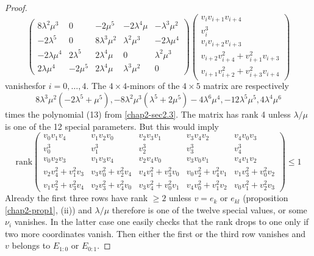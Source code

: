 \begin{proof}
$$\begin{pmatrix}
8\lambda^{2}\mu^{3} & 0 & -2\mu^{5} & -2\lambda^{4}\mu &
-\lambda^{3}\mu^{2}\\[5pt]
-2\lambda^{5} & 0 & 8\lambda^{3}\mu^{2} & \lambda^{2}\mu^{3} &
-2\lambda \mu^{4}\\[5pt]
-2\lambda \mu^{4} & 2\lambda^{5} & 2\lambda^{4}\mu & 0
& \lambda^{2}\mu^{3}\\[5pt]
2\lambda\mu^{4} & -2\mu^{5} & 2\lambda^{4}\mu & \lambda^{3}\mu^{2} & 0
\end{pmatrix}
\begin{pmatrix}
v_{i}v_{i+1}v_{i+4}\\[5pt]
v^{3}_{i}\\[5pt]
v_{i}v_{i+2}v_{i+3}\\[5pt]
v_{i+2}v^{2}_{i+4}+v^{2}_{i+1}v_{i+3}\\[5pt]
v_{i+1}v^{2}_{i+2}+v^{2}_{i+3}v_{i+4}
\end{pmatrix}
$$
vanishes\pageoriginale for $i=0,\ldots,4$. The $4\times 4$-minors of
the $4\times 5$ matrix are respectively
$$
8\lambda^{3}\mu^{2}(-2\lambda^{5}+\mu^{5}),-8\lambda^{2}\mu^{3}(\lambda^{5}+2\mu^{5})-4\lambda^{6}\mu^{4},-12\lambda^{5}\mu^{5},4\lambda^{4}\mu^{6}
$$
times the polynomial (13) from \ref{chap2-sec2.3}. The matrix has rank
4 unless $\lambda/\mu$ is one of the 12 special parameters. But this
would imply
{\fontsize{10pt}{12pt}\selectfont
$$
\text{rank}
\begin{pmatrix}
v_{0}v_{1}v_{4} & v_{1}v_{2}v_{0} & v_{2}v_{3}v_{1} & v_{3}v_{4}v_{2}
& v_{4}v_{0}v_{3}\\[5pt]
v^{3}_{0} & v^{3}_{1} & v^{3}_{2} & v^{3}_{3} & v^{3}_{4}\\[5pt]
v_{0}v_{2}v_{3} & v_{1}v_{3}v_{4} & v_{2}v_{4}v_{0} & v_{3}v_{0}v_{1}
& v_{4}v_{1}v_{2}\\[5pt]
v_{2}v^{2}_{4}+v^{2}_{1}v_{3} & v_{3}v^{2}_{0}+v^{2}_{2}v_{4} &
v_{4}v^{2}_{1}+v^{2}_{3}v_{0} & v_{0}v^{2}_{2}+v^{2}_{4}v_{1} &
v_{1}v^{2}_{3}+v^{2}_{0}v_{2}\\[5pt]
v_{1}v^{2}_{2}+v^{2}_{3}v_{4} & v_{2}v^{2}_{3}+v^{2}_{4}v_{0} &
v_{3}v^{2}_{4}+v^{2}_{0}v_{1} & v_{4}v^{2}_{0}+v^{2}_{1}v_{2} & v_{0}v^{2}_{1}+v^{2}_{2}v_{3}
\end{pmatrix}
\leq 1
$$}
Already the first three rows have rank $\geq 2$ unless $v=e_{k}$ or
$e_{kl}$ (proposition \ref{chap2-prop1}, (ii)) and $\lambda/\mu$
therefore is one of the twelve special values, or some $\nu_{i}$
vanishes. In the latter case one easily checks that the rank drops to
one only if two more coordinates vanish. Then either the first or the
third row vanishes and $v$ belongs to $E_{1:0}$ or $E_{0:1}$. 
\end{proof}

